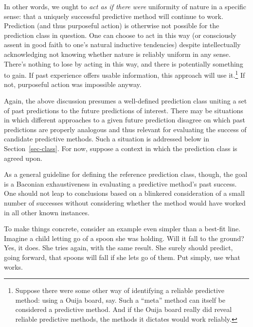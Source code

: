 \documentclass[
  letterpaper,
  DIV=11,
  numbers=noendperiod]{scrartcl}
\theoremstyle{definition}
\theoremstyle{remark}
\begin{document}
In other words, we ought to \emph{act as if there were} uniformity of
nature in a specific sense: that a uniquely successful predictive method
will continue to work. Prediction (and thus purposeful action) is
otherwise not possible for the prediction class in question. One can
choose to act in this way (or consciously assent in good faith to one's
natural inductive tendencies) despite intellectually acknowledging not
knowing whether nature is reliably uniform in any sense. There's nothing
to lose by acting in this way, and there is potentially something to
gain. If past experience offers usable information, this approach will
use it.\footnote{Suppose there were some other way of identifying a
  reliable predictive method: using a Ouija board, say. Such a ``meta''
  method can itself be considered a predictive method. And if the Ouija
  board really did reveal reliable predictive methods, the methods it
  dictates would work reliably.} If not, purposeful action was
impossible anyway.

Again, the above discussion presumes a well-defined prediction class
uniting a set of past predictions to the future predictions of interest.
There may be situations in which different approaches to a given future
prediction disagree on which past predictions are properly analogous and
thus relevant for evaluating the success of candidate predictive
methods. Such a situation is addressed below in Section~\ref{sec-class}.
For now, suppose a context in which the prediction class is agreed upon.

As a general guideline for defining the reference prediction class,
though, the goal is a Baconian exhaustiveness in evaluating a predictive
method's past success. One should not leap to conclusions based on a
blinkered consideration of a small number of successes without
considering whether the method would have worked in all other known
instances.

To make things concrete, consider an example even simpler than a
best-fit line. Imagine a child letting go of a spoon she was holding.
Will it fall to the ground? Yes, it does. She tries again, with the same
result. She surely should predict, going forward, that spoons will fall
if she lets go of them. Put simply, use what works.
\end{document}
